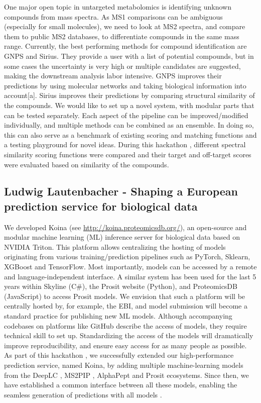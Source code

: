 One major open topic in untargeted metabolomics is identifying unknown compounds from mass spectra. As MS1 comparisons can be ambiguous (especially for small molecules), we need to look at MS2 spectra, and compare them to public MS2 databases, to differentiate compounds in the same mass range. Currently, the best performing methods for compound identification are GNPS and Sirius. They provide a user with a list of potential compounds, but in some cases the uncertainty is very high or multiple candidates are suggested, making the downstream analysis labor intensive. GNPS improves their predictions by using molecular networks and taking biological information into account[a]. Sirius improves their predictions by comparing structural similarity of the compounds. We would like to set up a novel system, with modular parts that can be tested separately. Each aspect of the pipeline can be improved/modified individually, and multiple methods can be combined as an ensemble. In doing so, this can also serve as a benchmark of existing scoring and matching functions and a testing playground for novel ideas.
During this hackathon \citep{issue13}, different spectral similarity scoring functions were compared and their target and off-target scores were evaluated based on similarity of the compounds.

\subsection{Ludwig Lautenbacher - Shaping a European prediction service for biological data}

We developed Koina (see \url{http://koina.proteomicsdb.org/}), an open-source and modular machine learning (ML) inference server for biological data based on NVIDIA Triton. This platform allows centralizing the hosting of models originating from various training/prediction pipelines such as PyTorch, Sklearn, XGBoost and TensorFlow. Most importantly, models can be accessed by a remote and language-independent interface. A similar system has been used for the last 5 years within Skyline (C\#), the Prosit website (Python), and ProteomicsDB (JavaScript) to access Prosit models. We envision that such a platform will be centrally hosted by, for example, the EBI, and model submission will become a standard practice for publishing new ML models. Although accompanying codebases on platforms like GitHub describe the access of models, they require technical skill to set up. Standardizing the access of the models will dramatically improve reproducibility, and ensure easy access for as many people as possible.
As part of this hackathon \citep{issue12}, we successfully extended our high-performance prediction service, named Koina, by adding multiple machine-learning models from the DeepLC \citep{pmid34711972}, MS2PIP \citep{pmid24078703, pmid25990723}, AlphaPept \citep{pmid36433986} and Prosit \citep{pmid31133760, pmid35549156, pmid34099720} ecosystems. Since then, we have established a common interface between all these models, enabling the seamless generation of predictions with all models \citep{Lautenbacher2024}.


